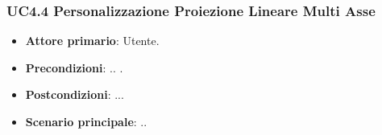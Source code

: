 \subsubsection{UC4.4 Personalizzazione Proiezione Lineare Multi Asse}
\begin{itemize}
	\item \textbf{Attore primario}: Utente.
	\item \textbf{Precondizioni}: .. .
	\item \textbf{Postcondizioni}: ...
	\item \textbf{Scenario principale}: ..
\end{itemize}